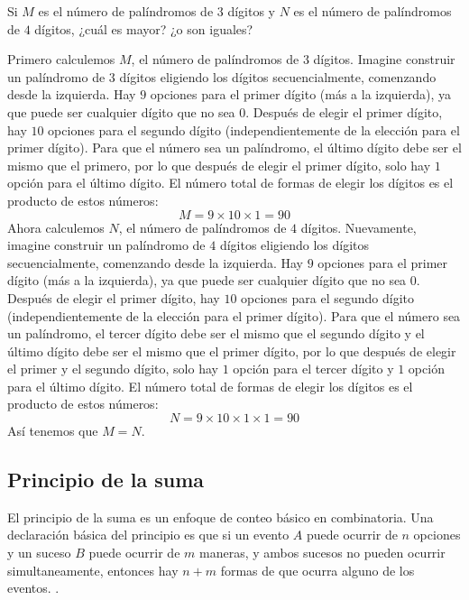 \begin{ejemplo}
    Si $M$ es el número de palíndromos de $3$ dígitos y $N$ es el número de palíndromos de $4$ dígitos, ¿cuál es mayor? ¿o son iguales?
\end{ejemplo}
\begin{solucion}
Primero calculemos $M$, el número de palíndromos de $3$ dígitos. Imagine construir un palíndromo de $3$ dígitos eligiendo los dígitos secuencialmente, comenzando desde la izquierda. Hay $9$ opciones para el primer dígito (más a la izquierda), ya que puede ser cualquier dígito que no sea $0$. Después de elegir el primer dígito, hay $10$ opciones para el segundo dígito (independientemente de la elección para el primer dígito). Para que el número sea un palíndromo, el último dígito debe ser el mismo que el primero, por lo que después de elegir el primer dígito, solo hay $1$ opción para el último dígito. El número total de formas de elegir los dígitos es el producto de estos números:
\[M=9\times 10\times 1=90\]
Ahora calculemos $N$, el número de palíndromos de $4$ dígitos. Nuevamente, imagine construir un palíndromo de $4$ dígitos eligiendo los dígitos secuencialmente, comenzando desde la izquierda. Hay $9$ opciones para el primer dígito (más a la izquierda), ya que puede ser cualquier dígito que no sea $0$. Después de elegir el primer dígito, hay $10$ opciones para el segundo dígito (independientemente de la elección para el primer dígito). Para que el número sea un palíndromo, el tercer dígito debe ser el mismo que el segundo dígito y el último dígito debe ser el mismo que el primer dígito, por lo que después de elegir el primer y el segundo dígito, solo hay $1$ opción para el tercer dígito y $1$ opción para el último dígito. El número total de formas de elegir los dígitos es el producto de estos números:
\[N=9\times 10 \times 1 \times 1=90\]
Así tenemos que $M=N$.
\end{solucion}

\subsection{Principio de la suma}
\begin{definicion}
El principio de la suma es un enfoque de conteo básico en combinatoria. Una declaración básica del principio es que si un evento $A$ puede ocurrir de $n$ opciones  y un suceso $B$ puede ocurrir de $m$ maneras, y ambos sucesos no pueden ocurrir simultaneamente, entonces hay $n+m$ formas de que ocurra alguno de los eventos. .
\end{definicion}

